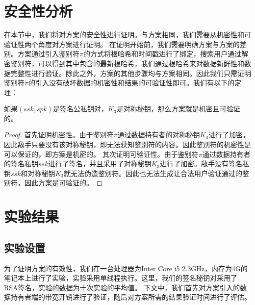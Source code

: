 \section{安全性分析}
在本节中，我们将对\multi 方案的安全性进行证明。与\single 方案相同，我们需要从机密性和可验证性两个角度对\multi 方案进行证明。
在证明开始前，我们需要明确\multi 方案与\single 方案的差别。\multi 方案通过引入鉴别符$\pi$的方式将根哈希和时间戳进行了绑定，搜索用户通过解密鉴别符，可以得到其中包含的最新根哈希，我们通过根哈希来对数据新鲜性和数据完整性进行验证。除此之外，\multi 方案的其他步骤均与\single 方案相同。因此我们只需证明鉴别符$\pi$的引入没有破坏数据的机密性和结果的可验证性即可。我们有以下的定理：
\begin{theorem}
    如果$(ssk,spk)$是签名公私钥对，$K_3$是对称秘钥，那么\multi 方案就是机密且可验证的。
\end{theorem}

\begin{proof}
    首先证明机密性。由于鉴别符$\pi$通过数据持有者的对称秘钥$K_3$进行了加密，因此敌手只要没有该对称秘钥，即无法获知鉴别符的内容。因此鉴别符的机密性是可以保证的，即\multi 方案是机密的。
    其次证明可验证性。由于鉴别符$\pi$通过数据持有者的签名私钥$ssk$进行了签名，并且采用了对称秘钥$K_3$进行了加密。敌手没有签名私钥$ssk$和对称秘钥$K_3$就无法伪造鉴别符。因此也无法生成让合法用户验证通过的鉴别符，因此\multi 方案是可验证的。
\end{proof}

\section{实验结果}
\subsection{实验设置}
为了证明\multi 方案的有效性，我们在一台处理器为Inter Core i5 2.3GHz，内存为4G的笔记本上进行了实验，实验采用单线程执行。这里，我们的签名秘钥对采用了RSA签名，实验的数据为十次实验的平均值。
下文中，我们首先对\multi 方案引入的数据持有者端的带宽开销进行了验证，随后对\multi 方案所需的结果验证时间进行了评估。
